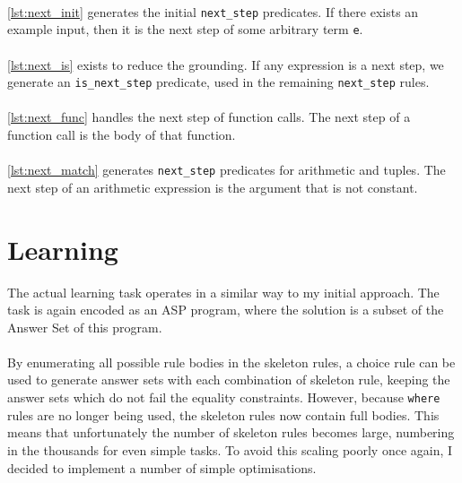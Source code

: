  
\mbox{} \\
\ref{lst:next_init} generates the initial \lstinline!next_step! predicates. If there exists an example input, then it is the next step of some arbitrary term \lstinline!e!. \\

 
\mbox{} \\
\ref{lst:next_is} exists to reduce the grounding. If any expression is a next step, we generate an \lstinline{is_next_step} predicate, used in the remaining \lstinline{next_step} rules.\\

 
\mbox{} \\
\ref{lst:next_func} handles the next step of function calls. The next step of a function call is the body of that function. \\

 
\mbox{} \\
\ref{lst:next_match} generates \lstinline{next_step} predicates for arithmetic and tuples. The next step of an arithmetic expression is the argument that is not constant. %

\section{Learning}
The actual learning task operates in a similar way to my initial approach. The task is again encoded as an ASP program, where the solution is a subset of the Answer Set of this program. \\ \\
By enumerating all possible rule bodies in the skeleton rules, a choice rule can be used to generate answer sets with each combination of skeleton rule, keeping the answer sets which do not fail the equality constraints. However, because \lstinline!where! rules are no longer being used, the skeleton rules now contain full bodies. This means that unfortunately the number of skeleton rules becomes large, numbering in the thousands for even simple tasks. To avoid this scaling poorly once again, I decided to implement a number of simple optimisations.%

